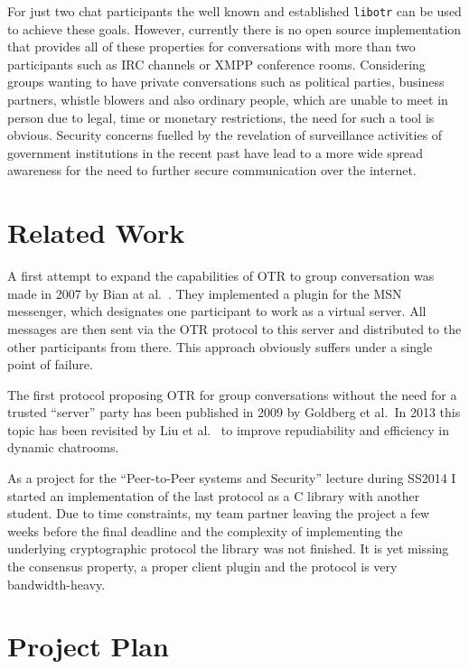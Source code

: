 For just two chat participants the well known and established
\texttt{libotr}\cite{otr} can be used to achieve these goals.  However,
currently there is no open source implementation that provides all of these
properties for conversations with more than two participants such as IRC
channels or XMPP conference rooms. Considering groups wanting to have private
conversations such as political parties, business partners, whistle blowers and
also ordinary people, which are unable to meet in person due to legal, time or
monetary restrictions, the need for such a tool is obvious. Security concerns
fuelled by the revelation of surveillance activities of government institutions
in the recent past have lead to a more wide spread awareness for the need to
further secure communication over the internet.

\section{Related Work}

A first attempt to expand the capabilities of OTR to group conversation was made
in 2007 by Bian at al.\ \cite{gotr}. They implemented a plugin for the MSN
messenger, which designates one participant to work as a virtual server. All
messages are then sent via the OTR protocol to this server and distributed to
the other participants from there. This approach obviously suffers under a
single point of failure.

The first protocol proposing OTR for group conversations without the need for a
trusted “server” party \cite{mp-otr} has been published in 2009 by Goldberg et
al.\ In 2013 this topic has been revisited by Liu et al.\ \cite{impr-gotr} to
improve repudiability and efficiency in dynamic chatrooms.

As a project for the “Peer-to-Peer systems and Security” lecture during SS2014 I
started an implementation of the last protocol as a C library\cite{libgotr} with
another student. Due to time constraints, my team partner leaving the project a
few weeks before the final deadline and the complexity of implementing the
underlying cryptographic protocol the library was not finished. It is yet
missing the consensus property, a proper client plugin and the protocol is very
bandwidth-heavy.

\section{Project Plan}

